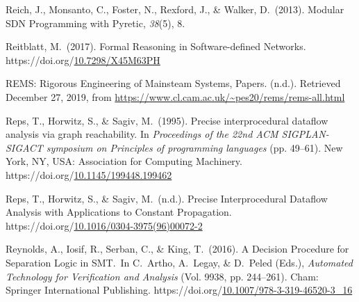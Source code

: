 \documentclass[12pt,twoside]{article}
\begin{document}
{\begin{thebibliography}{1079}
\mdbibitemlabel{}Reich, J., Monsanto, C., Foster, N., Rexford, J., \& Walker, D.~(2013). Modular SDN Programming with Pyretic, \emph{38}(5), 8.%

\mdbibitemlabel{}Reitblatt, M.~(2017). Formal Reasoning in Software-defined Networks. https://doi.org/\href{https://dx.doi.org/10.7298/X45M63PH}{10.7298/X45M63PH}%

\mdbibitemlabel{}REMS: Rigorous Engineering of Mainsteam Systems, Papers. (n.d.). Retrieved December 27, 2019, from \href{https://www.cl.cam.ac.uk/~pes20/rems/rems-all.html}{{\ttfamily https://\hspace{0pt}www.\hspace{0pt}cl.\hspace{0pt}cam.\hspace{0pt}ac.\hspace{0pt}uk/\hspace{0pt}\textasciitilde{}pes20/\hspace{0pt}rems/\hspace{0pt}rems-\hspace{0pt}all.\hspace{0pt}html}}%

\mdbibitemlabel{}Reps, T., Horwitz, S., \& Sagiv, M.~(1995). Precise interprocedural dataflow analysis via graph reachability. In \emph{Proceedings of the 22nd ACM SIGPLAN-SIGACT symposium on Principles of programming languages} (pp. 49–61). New York, NY, USA: Association for Computing Machinery. https://doi.org/\href{https://dx.doi.org/10.1145/199448.199462}{10.1145/199448.199462}%

\mdbibitemlabel{}Reps, T., Horwitz, S., \& Sagiv, M.~(n.d.). Precise Interprocedural Dataflow Analysis with Applications to Constant Propagation. https://doi.org/\href{https://dx.doi.org/10.1016/0304-3975\%252896\%252900072-2}{10.1016/0304-3975(96)00072-2}%

\mdbibitemlabel{}Reynolds, A., Iosif, R., Serban, C., \& King, T.~(2016). A Decision Procedure for Separation Logic in SMT.~In C.~Artho, A.~Legay, \& D.~Peled (Eds.), \emph{Automated Technology for Verification and Analysis} (Vol. 9938, pp. 244–261). Cham: Springer International Publishing. https://doi.org/\href{https://dx.doi.org/10.1007/978-3-319-46520-3_16}{10.1007/978-3-319-46520-3\_16}%


\end{thebibliography}}
\end{document}
